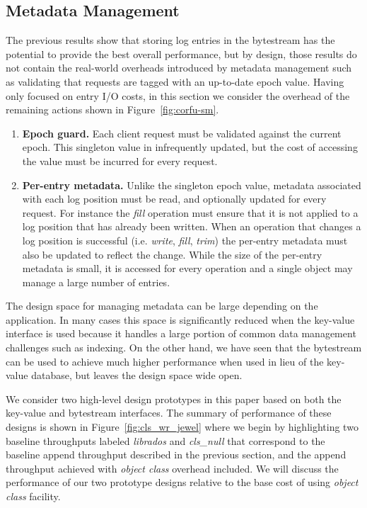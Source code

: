 \documentclass[10pt,twocolumn]{article}
\begin{document}
\subsection{Metadata Management}

The previous results show that storing log entries in the bytestream has the
potential to provide the best overall performance, but by design, those
results do not contain the real-world overheads introduced by metadata
management such as validating that requests are tagged with an up-to-date
epoch value. Having only focused on entry I/O costs, in this section we
consider the overhead of the remaining actions shown in
Figure~\ref{fig:corfu-sm}.

\begin{enumerate}
    \item {\bf Epoch guard.} Each client request must be validated against the
        current epoch. This singleton value in infrequently updated, but the
        cost of accessing the value must be incurred for every request.

    \item {\bf Per-entry metadata.} Unlike the singleton epoch value, metadata
        associated with each log position must be read, and optionally updated
        for every request. For instance the \emph{fill} operation must ensure
        that it is not applied to a log position that has already been
        written. When an operation that changes a log position is successful
        (i.e. \emph{write}, \emph{fill}, \emph{trim}) the per-entry metadata
        must also be updated to reflect the change. While the size of the
        per-entry metadata is small, it is accessed for every operation and a
        single object may manage a large number of entries.
\end{enumerate}

The design space for managing metadata can be large depending on the
application. In many cases this space is significantly reduced when the
key-value interface is used because it handles a large portion of common data
management challenges such as indexing. On the other hand, we have seen that
the bytestream can be used to achieve much higher performance when used in
lieu of the key-value database, but leaves the design space wide open.

We consider two high-level design prototypes in this paper based on both the
key-value and bytestream interfaces. The summary of performance of these
designs is shown in Figure~\ref{fig:cls_wr_jewel} where we begin by
highlighting two baseline throughputs labeled \emph{librados} and
\emph{cls\_null} that correspond to the baseline append throughput described
in the previous section, and the append throughput achieved with \emph{object
class} overhead included. We will discuss the performance of our two prototype
designs relative to the base cost of using \emph{object class} facility.
\end{document}
